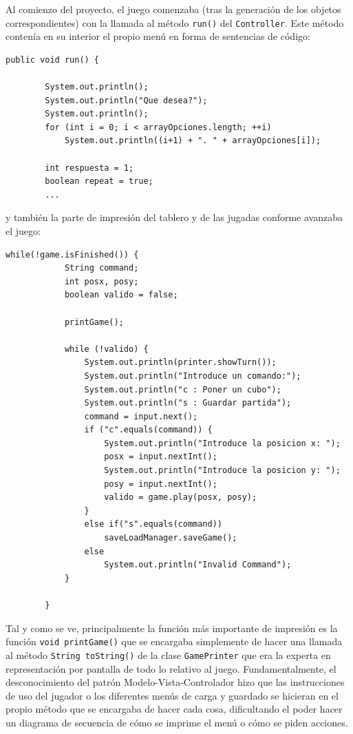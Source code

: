 \documentclass[../DocumentoOficial.tex]{subfiles}
\begin{document}
\begin{sprint}[1]
Al comienzo del proyecto, el juego comenzaba (tras la generación de los objetos correspondientes) con la llamada al método \texttt{run()} del \texttt{Controller}. Este método contenía en su interior el propio menú en forma de sentencias de código:
\begin{lstlisting}
public void run() {

		System.out.println();
		System.out.println("Que desea?");
		System.out.println();
		for (int i = 0; i < arrayOpciones.length; ++i)
			System.out.println((i+1) + ". " + arrayOpciones[i]);
		
		int respuesta = 1;
		boolean repeat = true;
		...
\end{lstlisting}
y también la parte de impresión del tablero y de las jugadas conforme avanzaba el juego:
\begin{lstlisting}
while(!game.isFinished()) {
			String command;
			int posx, posy;
			boolean valido = false;
			
			printGame();
			
			while (!valido) {
				System.out.println(printer.showTurn());
				System.out.println("Introduce un comando:");
				System.out.println("c : Poner un cubo");
				System.out.println("s : Guardar partida");
				command = input.next();
				if ("c".equals(command)) {
					System.out.println("Introduce la posicion x: ");
					posx = input.nextInt();
					System.out.println("Introduce la posicion y: ");
					posy = input.nextInt();
					valido = game.play(posx, posy);
				}					
				else if("s".equals(command))
					saveLoadManager.saveGame();
				else
					System.out.println("Invalid Command");										
			}
			
		}
\end{lstlisting}
Tal y como se ve, principalmente la función más importante de impresión es la función \texttt{void printGame()} que se encargaba simplemente de hacer una llamada al método \texttt{String toString()} de la clase \texttt{GamePrinter} que era la experta en representación por pantalla de todo lo relativo al juego. Fundamentalmente, el desconocimiento del patrón Modelo-Vista-Controlador hizo que las instrucciones de uso del jugador o los diferentes menús de carga y guardado se hicieran en el propio método que se encargaba de hacer cada cosa, dificultando el poder hacer un diagrama de secuencia de cómo se imprime el menú o cómo se piden acciones.
\end{sprint}
\end{document}
